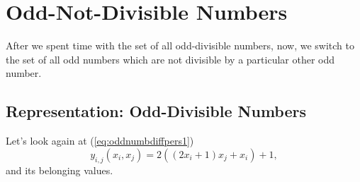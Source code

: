 \chapter{Odd-Not-Divisible Numbers}
\label{ch:oddnotdivisiblenumbers}
\minitoc
After we spent time with the set of all odd-divisible numbers, now, we switch to the set of all odd numbers which are not divisible by a particular other odd number.
\section{Representation: Odd-Divisible Numbers}
\label{s:repodddivnumbers}
Let's look again at (\ref{eq:oddnumbdiffpers1})
\[ y_{i,j}\left(x_{i},x_{j}\right) = 2\left(\left(2x_{i} + 1\right)x_{j} + x_{i}\right) + 1 ,\]
and its belonging values.
